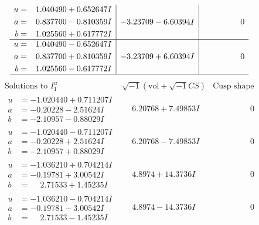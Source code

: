 \documentclass[1p]{elsarticle_modified}
\theoremstyle{definition}
\newcommand{\I}{\sqrt{-1}}
\begin{document}
$$\begin{array}{c|c|c}
\begin{aligned}
u &= \phantom{-}1.040490 + 0.652647 I \\
a &= \phantom{-}0.837700 - 0.810359 I \\
b &= \phantom{-}1.025560 + 0.617772 I\end{aligned}
 & -3.23709 - 6.60394 I & \phantom{-0.000000 } 0 \\ \hline\begin{aligned}
u &= \phantom{-}1.040490 - 0.652647 I \\
a &= \phantom{-}0.837700 + 0.810359 I \\
b &= \phantom{-}1.025560 - 0.617772 I\end{aligned}
 & -3.23709 + 6.60394 I & \phantom{-0.000000 } 0\\
 \hline 
 \end{array}$$\newpage$$\begin{array}{c|c|c}  
\text{Solutions to }I^u_{1}& \I (\text{vol} + \sqrt{-1}CS) & \text{Cusp shape}\\
 \hline 
\begin{aligned}
u &= -1.020440 + 0.711207 I \\
a &= -0.20228 - 2.51624 I \\
b &= -2.10957 - 0.88029 I\end{aligned}
 & \phantom{-}6.20768 + 7.49853 I & \phantom{-0.000000 } 0 \\ \hline\begin{aligned}
u &= -1.020440 - 0.711207 I \\
a &= -0.20228 + 2.51624 I \\
b &= -2.10957 + 0.88029 I\end{aligned}
 & \phantom{-}6.20768 - 7.49853 I & \phantom{-0.000000 } 0 \\ \hline\begin{aligned}
u &= -1.036210 + 0.704214 I \\
a &= -0.19781 + 3.00542 I \\
b &= \phantom{-}2.71533 + 1.45235 I\end{aligned}
 & \phantom{-}4.8974 + 14.3736 I & \phantom{-0.000000 } 0 \\ \hline\begin{aligned}
u &= -1.036210 - 0.704214 I \\
a &= -0.19781 - 3.00542 I \\
b &= \phantom{-}2.71533 - 1.45235 I\end{aligned}
 & \phantom{-}4.8974 - 14.3736 I & \phantom{-0.000000 } 0 \\ \hline\begin{aligned}

\end{aligned}
\end{array}$$
\end{document}
